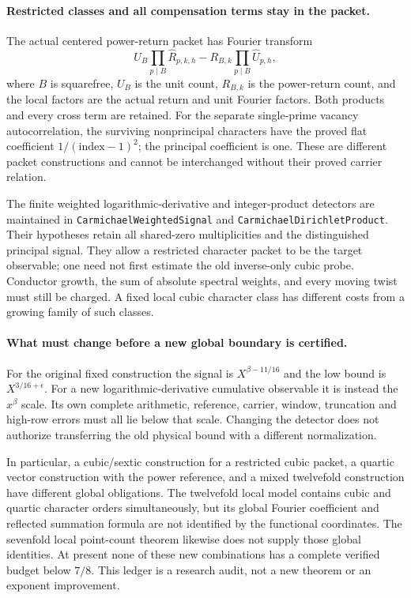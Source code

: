 \documentclass[11pt]{article}
\begin{document}
\paragraph{Restricted classes and all compensation terms stay in the packet.}
The actual centered power-return packet has Fourier transform
\[
 U_B\prod_{p\mid B}\widehat R_{p,k,h}
   -R_{B,k}\prod_{p\mid B}\widehat U_{p,h},
\]
where \(B\) is squarefree, \(U_B\) is the unit count, \(R_{B,k}\) is the
power-return count, and the local factors are the actual return and
unit Fourier factors. Both products and every cross term are retained.
For the separate single-prime vacancy autocorrelation, the surviving
nonprincipal characters have the proved flat coefficient
\(1/(\mathrm{index}-1)^2\); the principal coefficient is one.
These are different packet constructions and cannot be interchanged
without their proved carrier relation.

The finite weighted logarithmic-derivative and integer-product
detectors are maintained in \texttt{CarmichaelWeightedSignal} and
\texttt{CarmichaelDirichletProduct}. Their hypotheses retain all
shared-zero multiplicities and the distinguished principal signal.
They allow a restricted character packet to be the target observable;
one need not first estimate the old inverse-only cubic probe.
Conductor growth, the sum of absolute spectral weights, and every
moving twist must still be charged. A fixed local cubic character class
has different costs from a growing family of such classes.

\paragraph{What must change before a new global boundary is certified.}
For the original fixed construction the signal is
\(X^{\beta-11/16}\) and the low bound is \(X^{3/16+\epsilon}\).
For a new logarithmic-derivative cumulative observable it is instead
the \(x^\beta\) scale. Its own complete arithmetic, reference, carrier,
window, truncation and high-row errors must all lie below that scale.
Changing the detector does not authorize transferring the old physical
bound with a different normalization.

In particular, a cubic/sextic construction for a restricted cubic
packet, a quartic vector construction with the power reference, and a
mixed twelvefold construction have different global obligations.
The twelvefold local model contains cubic and quartic character orders
simultaneously, but its global Fourier coefficient and reflected
summation formula are not identified by the functional coordinates.
The sevenfold local point-count theorem likewise does not supply those
global identities. At present none of these new combinations has a
complete verified budget below \(7/8\). This ledger is a research audit,
not a new theorem or an exponent improvement.
\end{document}
